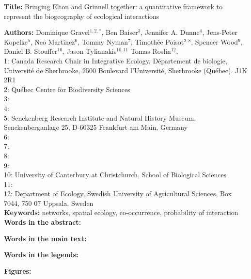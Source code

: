 \documentclass[12pt]{article}
\begin{document}
\linenumbers 
\modulolinenumbers[1]

\textbf{Title:} Bringing Elton and Grinnell together: a quantitative framework to represent the biogeography of ecological interactions

\textbf{Authors:} Dominique Gravel$^{1,2,*}$, Ben Baiser$^{3}$, Jennifer A. Dunne$^{4}$, Jens-Peter Kopelke$^{5}$, Neo
Martinez$^{6}$, Tommy Nyman$^{7}$, Timoth\'ee Poisot$^{2,8}$,  Spencer Wood$^{9}$, Daniel B. Stouffer$^{10}$, Jason Tylianakis$^{10,11}$ Tomas Roslin$^{12}$,\\

1: Canada Research Chair in Integrative Ecology. D\'epartement de
biologie, Universit\'e de Sherbrooke,  2500 Boulevard l'Universit\'e, 
Sherbrooke (Québec).  J1K 2R1\\

2: Qu\'ebec Centre for Biodiversity Sciences\\

3: \\

4: \\

5: Senckenberg Research Institute and Natural History Museum, Senckenberganlage 25, D-60325 Frankfurt am Main, Germany\\

6:\\

7:\\

8:\\

9:\\

10: University of Canterbury at Christchurch, School of Biological Sciences\\

11:\\

12: Department of Ecology, Swedish University of Agricultural Sciences, Box 7044, 750 07 Uppsala, Sweden\\ 

\textbf{Keywords:} networks, spatial ecology, co-occurrence, probability of interaction\\

\textbf{Words in the abstract:} 

\textbf{Words in the main text:} 

\textbf{Words in the legends:}  

\textbf{Figures:} 
\end{document}
